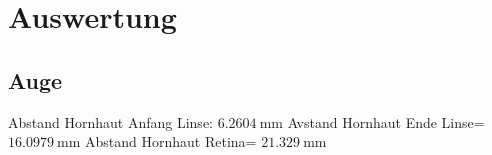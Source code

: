 \section{Auswertung}
\label{sec:Auswertung}




\subsection{Auge}

Abstand Hornhaut Anfang Linse:  $\SI{6,2604}{\milli\meter}$
Avstand Hornhaut Ende Linse=  $\SI{16,0979}{\milli\meter}$
Abstand Hornhaut Retina=  $\SI{21,329}{\milli\meter}$

